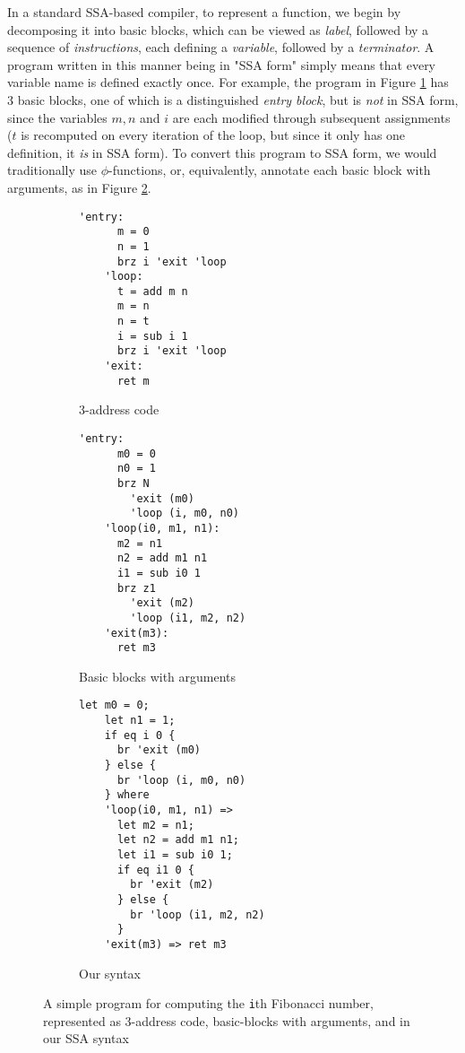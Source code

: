 \documentclass[acmsmall,screen,review]{acmart}
\begin{document}
In a standard SSA-based compiler, to represent a function, we begin by
decomposing it into basic blocks, which can be viewed as \textit{label},
followed by a sequence of \textit{instructions}, each defining a
\textit{variable}, followed by a \textit{terminator}. A program written in this
manner being in "SSA form" simply means that every variable name is defined
exactly once. For example, the program in Figure \ref{fig:3-addr} has 3 basic blocks, one of which is a distinguished \textit{entry block}, but is \textit{not} in SSA form, since the variables \(m, n\) and \(i\) are each modified through subsequent assignments (\(t\) is recomputed on every iteration of the loop, but since it only has one definition, it \textit{is} in SSA form). To convert this program to SSA form, we would traditionally use \(\phi\)-functions, or, equivalently, annotate each basic block with arguments, as in Figure \ref{fig:bb-arg}.

\begin{figure}
  \centering
  \begin{subfigure}[t]{0.33\textwidth}
    \begin{BVerbatim}[baseline=t, gobble=3]
    'entry:
      m = 0
      n = 1
      brz i 'exit 'loop
    'loop:
      t = add m n
      m = n
      n = t
      i = sub i 1
      brz i 'exit 'loop
    'exit:
      ret m
    \end{BVerbatim}
    \caption{3-address code}
    \label{fig:3-addr}
  \end{subfigure}
  \begin{subfigure}[t]{0.32\textwidth}
    \begin{BVerbatim}[baseline=t, gobble=3]
      'entry:
      m0 = 0
      n0 = 1
      brz N 
        'exit (m0) 
        'loop (i, m0, n0)
    'loop(i0, m1, n1):
      m2 = n1
      n2 = add m1 n1
      i1 = sub i0 1
      brz z1 
        'exit (m2) 
        'loop (i1, m2, n2)
    'exit(m3):
      ret m3
    \end{BVerbatim}
    \caption{Basic blocks with arguments}
    \label{fig:bb-arg}
  \end{subfigure}
  \begin{subfigure}[t]{0.33\textwidth}
    \begin{BVerbatim}[baseline=t, gobble=3]
    let m0 = 0;
    let n1 = 1;
    if eq i 0 {
      br 'exit (m0)
    } else {
      br 'loop (i, m0, n0)
    } where
    'loop(i0, m1, n1) =>
      let m2 = n1;
      let n2 = add m1 n1;
      let i1 = sub i0 1;
      if eq i1 0 {
        br 'exit (m2)
      } else {
        br 'loop (i1, m2, n2)
      }
    'exit(m3) => ret m3
    \end{BVerbatim}
    \caption{Our syntax}
    \label{fig:our-syn}
  \end{subfigure}
  \caption{A simple program for computing the \texttt{i}th Fibonacci number, represented as 3-address code, basic-blocks with arguments, and in our SSA syntax}
  \Description{}
  \label{fig:ssa-examples}
\end{figure}
\end{document}
